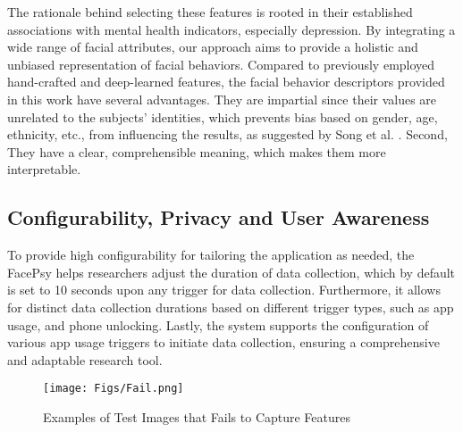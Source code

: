  The rationale behind selecting these features is rooted in their established associations with mental health indicators, especially depression. By integrating a wide range of facial attributes, our approach aims to provide a holistic and unbiased representation of facial behaviors. Compared to previously employed hand-crafted and deep-learned features, the facial behavior descriptors provided in this work have several advantages. They are impartial since their values are unrelated to the subjects' identities, which prevents bias based on gender, age, ethnicity, etc., from influencing the results, as suggested by Song et al. \cite{song_spectral_2020}. Second, They have a clear, comprehensible meaning, which makes them more interpretable.



\subsection{Configurability, Privacy and User Awareness}
\label{sec:CP}
To provide high configurability for tailoring the application as needed, the FacePsy helps researchers adjust the duration of data collection, which by default is set to 10 seconds upon any trigger for data collection. Furthermore, it allows for distinct data collection durations based on different trigger types, such as app usage, and phone unlocking. Lastly, the system supports the configuration of various app usage triggers to initiate data collection, ensuring a comprehensive and adaptable research tool.

 \begin{figure}[h]
    \texttt{[image: Figs/Fail.png]}
    \caption{Examples of Test Images that Fails to Capture Features}
    \label{fig:FacePsyFail}
\end{figure}

